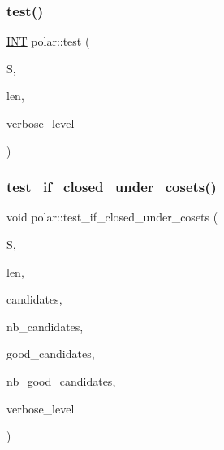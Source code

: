 \mbox{\label{classpolar_a572e42f92cd6a03dc1b12a1371024958}} 
\subsubsection{\texorpdfstring{test()}{test()}}
{\footnotesize\ttfamily \mbox{\hyperlink{galois_8h_a09fddde158a3a20bd2dcadb609de11dc}{I\+NT}} polar\+::test (\begin{DoxyParamCaption}\item[{\mbox{\hyperlink{galois_8h_a09fddde158a3a20bd2dcadb609de11dc}{I\+NT}} $\ast$}]{S,  }\item[{\mbox{\hyperlink{galois_8h_a09fddde158a3a20bd2dcadb609de11dc}{I\+NT}}}]{len,  }\item[{\mbox{\hyperlink{galois_8h_a09fddde158a3a20bd2dcadb609de11dc}{I\+NT}}}]{verbose\+\_\+level }\end{DoxyParamCaption})}

\mbox{\label{classpolar_ac138ccb36cf30d262a8d8eb55e74486f}} 
\subsubsection{\texorpdfstring{test\+\_\+if\+\_\+closed\+\_\+under\+\_\+cosets()}{test\_if\_closed\_under\_cosets()}}
{\footnotesize\ttfamily void polar\+::test\+\_\+if\+\_\+closed\+\_\+under\+\_\+cosets (\begin{DoxyParamCaption}\item[{\mbox{\hyperlink{galois_8h_a09fddde158a3a20bd2dcadb609de11dc}{I\+NT}} $\ast$}]{S,  }\item[{\mbox{\hyperlink{galois_8h_a09fddde158a3a20bd2dcadb609de11dc}{I\+NT}}}]{len,  }\item[{\mbox{\hyperlink{galois_8h_a09fddde158a3a20bd2dcadb609de11dc}{I\+NT}} $\ast$}]{candidates,  }\item[{\mbox{\hyperlink{galois_8h_a09fddde158a3a20bd2dcadb609de11dc}{I\+NT}}}]{nb\+\_\+candidates,  }\item[{\mbox{\hyperlink{galois_8h_a09fddde158a3a20bd2dcadb609de11dc}{I\+NT}} $\ast$}]{good\+\_\+candidates,  }\item[{\mbox{\hyperlink{galois_8h_a09fddde158a3a20bd2dcadb609de11dc}{I\+NT}} \&}]{nb\+\_\+good\+\_\+candidates,  }\item[{\mbox{\hyperlink{galois_8h_a09fddde158a3a20bd2dcadb609de11dc}{I\+NT}}}]{verbose\+\_\+level }\end{DoxyParamCaption})}

